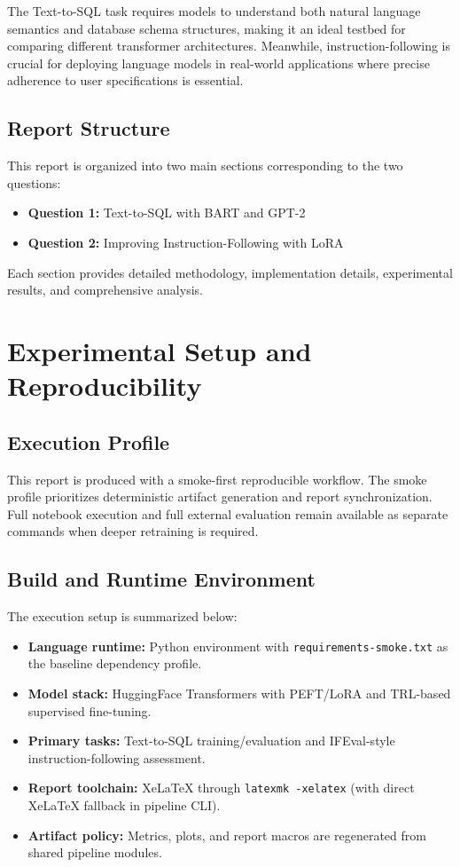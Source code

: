 \documentclass[conference]{IEEEtran}
\begin{document}
The Text-to-SQL task requires models to understand both natural language semantics and database schema structures, making it an ideal testbed for comparing different transformer architectures. Meanwhile, instruction-following is crucial for deploying language models in real-world applications where precise adherence to user specifications is essential.

\subsection{Report Structure}
This report is organized into two main sections corresponding to the two questions:
\begin{itemize}
    \item \textbf{Question 1:} Text-to-SQL with BART and GPT-2
    \item \textbf{Question 2:} Improving Instruction-Following with LoRA
\end{itemize}

Each section provides detailed methodology, implementation details, experimental results, and comprehensive analysis.





\section{Experimental Setup and Reproducibility}
\subsection{Execution Profile}
This report is produced with a smoke-first reproducible workflow. The smoke profile prioritizes deterministic artifact generation and report synchronization. Full notebook execution and full external evaluation remain available as separate commands when deeper retraining is required.

\subsection{Build and Runtime Environment}
The execution setup is summarized below:
\begin{itemize}
    \item \textbf{Language runtime:} Python environment with \texttt{requirements-smoke.txt} as the baseline dependency profile.
    \item \textbf{Model stack:} HuggingFace Transformers with PEFT/LoRA and TRL-based supervised fine-tuning.
    \item \textbf{Primary tasks:} Text-to-SQL training/evaluation and IFEval-style instruction-following assessment.
    \item \textbf{Report toolchain:} XeLaTeX through \texttt{latexmk -xelatex} (with direct XeLaTeX fallback in pipeline CLI).
    \item \textbf{Artifact policy:} Metrics, plots, and report macros are regenerated from shared pipeline modules.
\end{itemize}
\end{document}
